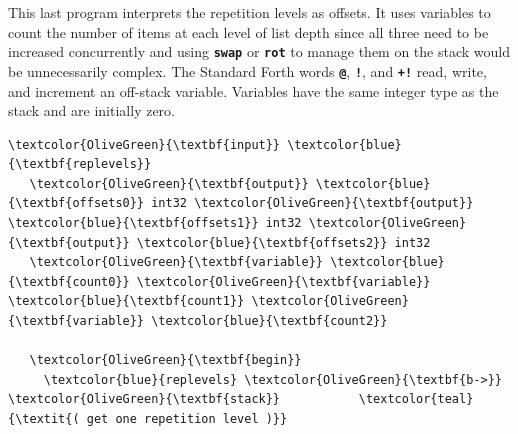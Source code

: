 \documentclass{webofc}
\begin{document}
\noindent This last program interprets the repetition levels as offsets. It uses variables to count the number of items at each level of list depth since all three need to be increased concurrently and using \textcolor{OliveGreen}{\tt\textbf{swap}} or \textcolor{OliveGreen}{\tt\textbf{rot}} to manage them on the stack would be unnecessarily complex. The Standard Forth words \textcolor{OliveGreen}{\tt\textbf{@}}, \textcolor{OliveGreen}{\tt\textbf{!}}, and \textcolor{OliveGreen}{\tt\textbf{+!}} read, write, and increment an off-stack variable. Variables have the same integer type as the stack and are initially zero.

\small
\begin{Verbatim}[commandchars=\\\{\}]
   \textcolor{OliveGreen}{\textbf{input}} \textcolor{blue}{\textbf{replevels}}
   \textcolor{OliveGreen}{\textbf{output}} \textcolor{blue}{\textbf{offsets0}} int32 \textcolor{OliveGreen}{\textbf{output}} \textcolor{blue}{\textbf{offsets1}} int32 \textcolor{OliveGreen}{\textbf{output}} \textcolor{blue}{\textbf{offsets2}} int32
   \textcolor{OliveGreen}{\textbf{variable}} \textcolor{blue}{\textbf{count0}} \textcolor{OliveGreen}{\textbf{variable}} \textcolor{blue}{\textbf{count1}} \textcolor{OliveGreen}{\textbf{variable}} \textcolor{blue}{\textbf{count2}}

   \textcolor{OliveGreen}{\textbf{begin}}
     \textcolor{blue}{replevels} \textcolor{OliveGreen}{\textbf{b->}} \textcolor{OliveGreen}{\textbf{stack}}           \textcolor{teal}{\textit{( get one repetition level )}}


\end{Verbatim}
\end{document}
